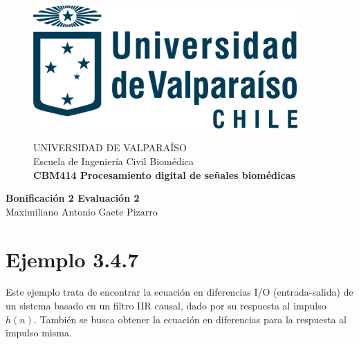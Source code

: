 \documentclass[10pt]{article}
\theoremstyle{definition}
\theoremstyle{remark}
\theoremstyle{definition}
\numberwithin{equation}{prob}
\begin{document}
	
	\begin{titlepage}
		
		
		\begin{figure}
			\begin{minipage}{4cm}
				\includegraphics[width=0.9\textwidth]{./figures/logo}
			\end{minipage}
			\begin{minipage}{11cm}
				\vspace{4mm}
				{\sc UNIVERSIDAD DE VALPARAÍSO}\\
				Escuela de Ingeniería Civil Biomédica\\
				{\bf CBM414 Procesamiento digital de señales biomédicas}\\
				\vspace{0mm}
				\hrulefill
			\end{minipage}
		\end{figure}
		\phantom{""}\vspace{60mm}
		
		
		\begin{center}
			\Huge{\textbf{Bonificación 2 Evaluación 2}}\vspace{95mm}\\
			\raggedleft \Large{Maximiliano Antonio Gaete Pizarro}\\ 
		\end{center}
		
		
	\end{titlepage}
	
\printindex

\section*{Ejemplo 3.4.7}

Este ejemplo trata de encontrar la ecuación en diferencias I/O (entrada-salida) de un sistema basado en un filtro IIR causal, dado por su respuesta al impulso \( h(n) \). También se busca obtener la ecuación en diferencias para la respuesta al impulso misma.
\end{document}
